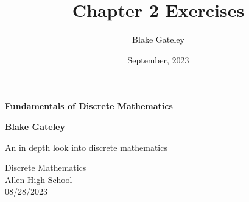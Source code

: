 \documentclass[12pt]{article}
\title{Chapter 2 Exercises}
\author{Blake Gateley}
\date{September, 2023}
\begin{document}
\begin{titlepage}
   \begin{center}
       \vspace*{1cm}

       {\Huge \textbf{Fundamentals of Discrete Mathematics}}

       \vspace{0.5cm}
            
       \vspace{1.5cm}

       \textbf{Blake Gateley}


       
       \vfill
            
       An in depth look into discrete mathematics
            
       \vspace{0.8cm}
     
   
            
       Discrete Mathematics\\
       Allen High School\\
       08/28/2023
            
   \end{center}
\end{titlepage}
\tableofcontents

\newpage
\end{document}
